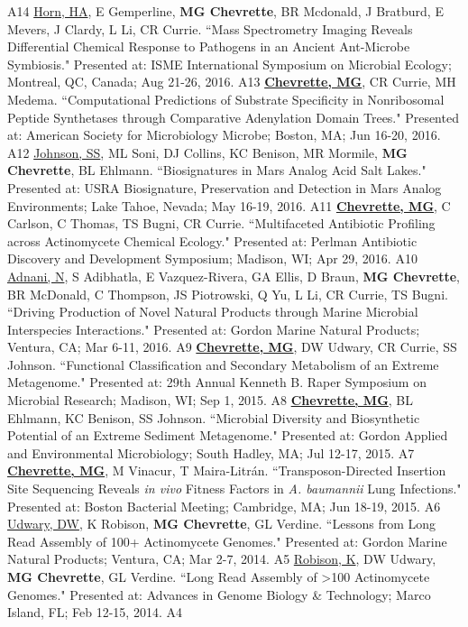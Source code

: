 \begin{cvpubs}
    {A14} %
  \cvpub
    {\underline{Horn, HA}, E Gemperline, \textbf{MG Chevrette}, BR Mcdonald, J Bratburd, E Mevers, J Clardy, L Li, CR Currie. ``Mass Spectrometry Imaging Reveals Differential Chemical Response to Pathogens in an Ancient Ant-Microbe Symbiosis." Presented at: ISME International Symposium on Microbial Ecology; Montreal, QC, Canada; Aug 21-26, 2016.} %
    {A13} %
  \cvpub
    {\textbf{\underline{Chevrette, MG}}, CR Currie, MH Medema.  ``Computational Predictions of Substrate Specificity in Nonribosomal Peptide Synthetases through Comparative Adenylation Domain Trees." Presented at: American Society for Microbiology Microbe; Boston, MA; Jun 16-20, 2016.} %
    {A12} %
  \cvpub
    {\underline{Johnson, SS}, ML Soni, DJ Collins, KC Benison, MR Mormile, \textbf{MG Chevrette}, BL Ehlmann. ``Biosignatures in Mars Analog Acid Salt Lakes." Presented at: USRA Biosignature, Preservation and Detection in Mars Analog Environments; Lake Tahoe, Nevada; May 16-19, 2016.} %
    {A11} %
  \cvpub
    {\textbf{\underline{Chevrette, MG}}, C Carlson, C Thomas, TS Bugni, CR Currie. ``Multifaceted Antibiotic Profiling across Actinomycete Chemical Ecology." Presented at: Perlman Antibiotic Discovery and Development Symposium; Madison, WI; Apr 29, 2016.} %
    {A10} %
  \cvpub
    {\underline{Adnani, N}, S Adibhatla, E Vazquez-Rivera, GA Ellis, D Braun, \textbf{MG Chevrette}, BR McDonald, C Thompson, JS Piotrowski, Q Yu, L Li, CR Currie, TS Bugni. ``Driving Production of Novel Natural Products through Marine Microbial Interspecies Interactions." Presented at: Gordon Marine Natural Products; Ventura, CA; Mar 6-11, 2016.} %
    {A9} %
  \cvpub
    {\textbf{\underline{Chevrette, MG}}, DW Udwary, CR Currie, SS Johnson. ``Functional Classification and Secondary Metabolism of an Extreme Metagenome." Presented at: 29th Annual Kenneth B. Raper Symposium on Microbial Research; Madison, WI; Sep 1, 2015.} %
    {A8} %
  \cvpub
    {\textbf{\underline{Chevrette, MG}}, BL Ehlmann, KC Benison, SS Johnson. ``Microbial Diversity and Biosynthetic Potential of an Extreme Sediment Metagenome." Presented at: Gordon Applied and Environmental Microbiology; South Hadley, MA; Jul 12-17, 2015.} %
    {A7} %
  \cvpub
    {\textbf{\underline{Chevrette, MG}}, M Vinacur, T Maira-Litr\'{a}n. ``Transposon-Directed Insertion Site Sequencing Reveals \textit{in vivo} Fitness Factors in \textit{A. baumannii} Lung Infections." Presented at: Boston Bacterial Meeting; Cambridge, MA; Jun 18-19, 2015.} %
    {A6} %
  \cvpub
    {\underline{Udwary, DW}, K Robison, \textbf{MG Chevrette}, GL Verdine. ``Lessons from Long Read Assembly of 100+ Actinomycete Genomes." Presented at: Gordon Marine Natural Products; Ventura, CA; Mar 2-7, 2014.} %
    {A5} %
  \cvpub
    {\underline{Robison, K}, DW Udwary, \textbf{MG Chevrette}, GL Verdine. ``Long Read Assembly of >100 Actinomycete Genomes." Presented at: Advances in Genome Biology \& Technology; Marco Island, FL; Feb 12-15, 2014.} %
    {A4} %
\end{cvpubs}
